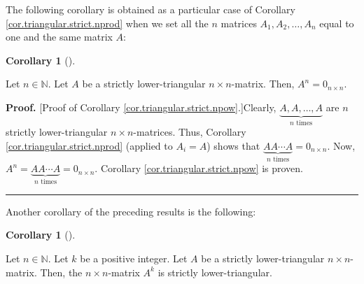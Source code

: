 \documentclass[numbers=enddot,12pt,final,onecolumn,notitlepage]{scrartcl}%
\theoremstyle{definition}
\newtheorem{coro}[theo]{Corollary}
\newenvironment{corollary}[1][]
{\begin{coro}[#1]\begin{leftbar}}
{\end{leftbar}\end{coro}}
\newenvironment{proof}[1][Proof]{\noindent\textbf{#1.} }{\ \rule{0.5em}{0.5em}}
\begin{document}
The following corollary is obtained as a particular case of Corollary
\ref{cor.triangular.strict.nprod} when we set all the $n$ matrices
$A_{1},A_{2},\ldots,A_{n}$ equal to one and the same matrix $A$:

\begin{corollary}
\label{cor.triangular.strict.npow}Let $n\in\mathbb{N}$. Let $A$ be a strictly
lower-triangular $n\times n$-matrix. Then, $A^{n}=0_{n\times n}$.
\end{corollary}

\begin{proof}
[Proof of Corollary \ref{cor.triangular.strict.npow}.]Clearly,
$\underbrace{A,A,\ldots,A}_{n\text{ times}}$ are $n$ strictly lower-triangular
$n\times n$-matrices. Thus, Corollary \ref{cor.triangular.strict.nprod}
(applied to $A_{i}=A$) shows that $\underbrace{AA\cdots A}_{n\text{ times}%
}=0_{n\times n}$. Now, $A^{n}=\underbrace{AA\cdots A}_{n\text{ times}%
}=0_{n\times n}$. Corollary \ref{cor.triangular.strict.npow} is proven.
\end{proof}

Another corollary of the preceding results is the following:

\begin{corollary}
\label{cor.triangular.strict.kpow-weak}Let $n\in\mathbb{N}$. Let $k$ be a
positive integer. Let $A$ be a strictly lower-triangular $n\times n$-matrix.
Then, the $n\times n$-matrix $A^{k}$ is strictly lower-triangular.
\end{corollary}
\end{document}
